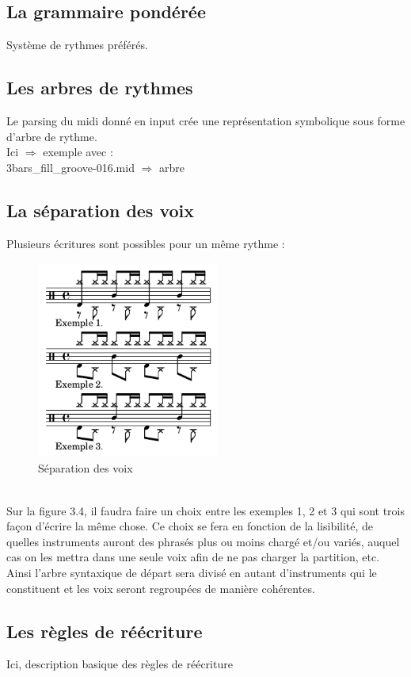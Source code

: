 \subsection{La grammaire pondérée}
Système de rythmes préférés.
\subsection{Les arbres de rythmes}
Le parsing du midi donné en input crée une représentation symbolique sous forme d’arbre de rythme.\\
Ici $\Rightarrow$ exemple avec :\\
3bars\_fill\_groove-016.mid $\Rightarrow$ arbre\\
\subsection{La séparation des voix}
Plusieurs écritures sont possibles pour un même rythme :
\begin{figure}[h]
	\includegraphics[height=65mm, width=60mm]{z_images/1_description_notation/separation/0_exemples_separation.png}
	\caption{Séparation des voix}
\end{figure}\\
Sur la figure 3.4, il faudra faire un choix entre les exemples 1, 2 et 3 qui sont trois façon d’écrire la même chose. Ce choix se fera en fonction de la lisibilité, de quelles instruments auront des phrasés plus ou moins chargé et/ou variés, auquel cas on les mettra dans une seule voix afin de ne pas charger la partition, etc.
Ainsi l’arbre syntaxique de départ sera divisé en autant d’instruments qui le constituent et les voix seront regroupées de manière cohérentes.
\subsection{Les règles de réécriture}
Ici, description basique des règles de réécriture 
